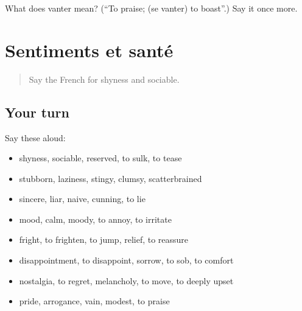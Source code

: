 \begin{tcolorbox}[breakable,colback=teal!4,colframe=teal!35!black,title={Before you move on}]
What does vanter mean? (\textquotedblleft{}To praise; (se vanter) to boast\textquotedblright{}.) Say it once more.
\end{tcolorbox}
\section[(dialogue)]{Sentiments et santé}

\label{lesson:FR-R473-revision-466-473}



\begin{quote}
Say the French for shyness and sociable.
\end{quote}

\subsection*{Your turn}
Say these aloud:

\begin{itemize}
\raggedright
  \item shyness, sociable, reserved, to sulk, to tease
  \item stubborn, laziness, stingy, clumsy, scatterbrained
  \item sincere, liar, naive, cunning, to lie
  \item mood, calm, moody, to annoy, to irritate
  \item fright, to frighten, to jump, relief, to reassure
  \item disappointment, to disappoint, sorrow, to sob, to comfort
  \item nostalgia, to regret, melancholy, to move, to deeply upset
  \item pride, arrogance, vain, modest, to praise
\end{itemize}

